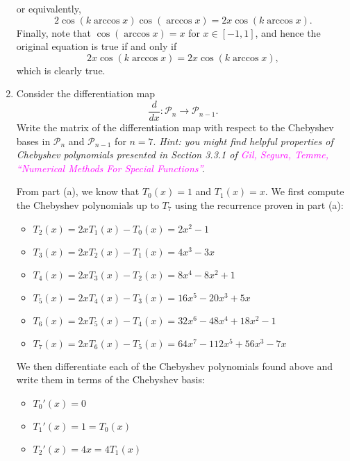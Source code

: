 \documentclass{../../../kin_math}
\begin{document}
\begin{questions}
\begin{enumerate}
\begin{solution}
\begin{equation*}
      \end{equation*}
      or equivalently,
      \begin{equation*}
        2\cos(k \arccos x)\cos(\arccos x) = 2x\cos(k \arccos x).
      \end{equation*}
      Finally, note that $\cos(\arccos x) = x$ for $x \in [-1, 1]$, and hence the original equation is true if and only if
      \begin{equation*}
        2x \cos(k \arccos x) = 2x\cos(k \arccos x),
      \end{equation*}
      which is clearly true.
    \end{solution}
    \item Consider the differentiation map
    \begin{equation*}
      \frac{d}{dx}: \mathcal{P}_n \to \mathcal{P}_{n - 1}.
    \end{equation*}
    Write the matrix of the differentiation map with respect to the Chebyshev bases in $\mathcal{P}_n$ and $\mathcal{P}_{n - 1}$ for $n = 7$. \emph{Hint: you might find helpful properties of Chebyshev polynomials presented in Section 3.3.1 of \textcolor{magenta}{Gil, Segura, Temme, ``Numerical Methods For Special Functions''}.}
    \begin{solution}
      From part (a), we know that $T_0(x) = 1$ and $T_1(x) = x$. We first compute the Chebyshev polynomials up to $T_7$ using the recurrence proven in part (a):
      \begin{itemize}
        \item $T_2(x) = 2xT_1(x) - T_0(x) = 2x^2 - 1$
        \item $T_3(x) = 2xT_2(x) - T_1(x) = 4x^3 - 3x$
        \item $T_4(x) = 2xT_3(x) - T_2(x) = 8x^4 - 8x^2 + 1$
        \item $T_5(x) = 2xT_4(x) - T_3(x) = 16x^5 - 20x^3 + 5x$
        \item $T_6(x) = 2xT_5(x) - T_4(x) = 32x^6 - 48x^4 + 18x^2 - 1$
        \item $T_7(x) = 2xT_6(x) - T_5(x) = 64x^7 - 112x^5 + 56x^3 - 7x$
      \end{itemize}
      We then differentiate each of the Chebyshev polynomials found above and write them in terms of the Chebyshev basis:
      \begin{itemize}
        \item $T_0'(x) = 0$
        \item $T_1'(x) = 1 = T_0(x)$
        \item $T_2'(x) = 4x = 4T_1(x)$

\end{itemize}
\end{solution}
\end{enumerate}
\end{questions}
\end{document}
